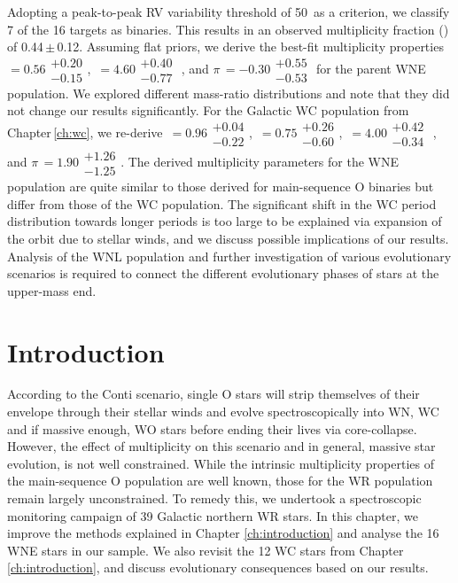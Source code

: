 \begin{abs}
Adopting a peak-to-peak RV variability threshold of 50\,\kms{} as a criterion, we classify 7 of the 16 targets as binaries. This results in an observed multiplicity fraction (\fobsWNE{}) of 0.44\,$\pm$\,0.12. Assuming flat priors, we derive the best-fit multiplicity properties \fintWNE{}\,$= 0.56\substack{+0.20 \\ -0.15}$, \logPmax{}\,$= 4.60\substack{+0.40 \\ -0.77}$ , and $\pi$\,$= -0.30\substack{+0.55 \\ -0.53}$ for the parent WNE population. We explored different mass-ratio distributions and note that they did not change our results significantly. For the Galactic WC population from Chapter\,\ref{ch:wc}, we re-derive \fintWC{}\,$= 0.96\substack{+0.04 \\ -0.22}$, \logPmin{}\,$= 0.75\substack{+0.26 \\ -0.60}$, \logPmax{}\,$= 4.00\substack{+0.42 \\ -0.34}$ , and $\pi$\,$= 1.90\substack{+1.26 \\ -1.25}$. 
The derived multiplicity parameters for the WNE population are quite similar to those derived for main-sequence O binaries but differ from those of the WC population. The significant shift in the WC period distribution towards longer periods is too large to be explained via expansion of the orbit due to stellar winds, and we discuss possible implications of our results. Analysis of the WNL population and further investigation of various evolutionary scenarios is required to connect the different evolutionary phases of stars at the upper-mass end. 
\end{abs}

\section{Introduction}

According to the Conti scenario, single O stars will strip themselves of their envelope through their stellar winds and evolve spectroscopically into WN, WC and if massive enough, WO stars before ending their lives via core-collapse. However, the effect of multiplicity on this scenario and in general, massive star evolution, is not well constrained. While the intrinsic multiplicity properties of the main-sequence O population are well known, those for the WR population remain largely unconstrained. To remedy this, we undertook a spectroscopic monitoring campaign of 39 Galactic northern WR stars. In this chapter, we improve the methods explained in Chapter \ref{ch:introduction} and analyse the 16 WNE stars in our sample. We also revisit the 12 WC stars from Chapter \ref{ch:introduction}, and discuss evolutionary consequences based on our results.

